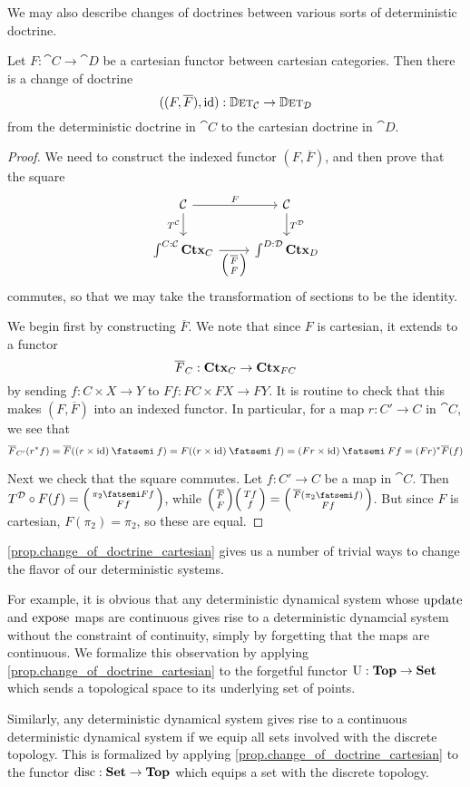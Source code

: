 \documentclass[DynamicalBook]{subfiles}
\begin{document}
We may also describe changes of doctrines between various sorts of deterministic
doctrine. 
\begin{proposition}\label{prop.change_of_doctrine_cartesian}
Let $F : \cat{C} \to \cat{D}$ be a cartesian functor between cartesian
categories. Then there is a change of doctrine
\[
((F, \overline{F}), \mathrm{id}) : \mathbb{D}\textsc{et}_{\mathcal{C}} \to \mathbb{D}\textsc{et}_{\mathcal{D}} 
\]
from the deterministic doctrine in $\cat{C}$ to the cartesian doctrine in $\cat{D}$.
\end{proposition}
\begin{proof}
We need to construct the indexed functor $(F, \overline{F})$, and then prove
that the square 
\[
  \begin{tikzcd}
\cat{C} \ar[r, "F"]\ar[d,"T^{\cat{C}}"'] & \cat{C}  \ar[d,"T^{\cat{D}}"]\\
  \int^{C : \cat{C}}\smctx{C} \ar[r, "{\littlelens{\overline{F}}{F}}"']  & \int^{D : \cat{D}}
  \smctx{D}  
  \end{tikzcd}
\]
commutes, so that we may take the transformation of sections to be the identity.

We begin first by constructing $\overline{F}$. We note that since $F$ is
cartesian, it extends to a functor
$$\overline{F}_C : \textbf{Ctx}_{C} \to \textbf{Ctx}_{FC}$$
by sending $f : C \times X \to Y$ to $Ff : FC \times FX \to FY$. It is routine
to check that this makes $(F, \overline{F})$ into an indexed functor. In
particular, for a map
$r : C' \to C$ in $\cat{C}$, we see that
\[
\overline{F}_{C'}(r^{\ast}f) = \overline{F}((r \times \id) \then f) = F((r
\times \id) \then f) = (Fr \times \id) \then Ff = (Fr)^{\ast}\overline{F}(f)
\]

Next we check that the square commutes. Let $f : C' \to C$ be a map in
$\cat{C}$. Then $T^{\cat{D}} \circ F (f) = \lens{\pi_2 \then Ff}{Ff}$, while
$\lens{\overline{F}}{F}\lens{Tf}{f} = \lens{\overline{F}(\pi_2 \then f)}{Ff}$.
But since $F$ is cartesian, $F(\pi_2) = \pi_2$, so these are equal.
\end{proof}

\begin{example}
  \cref{prop.change_of_doctrine_cartesian} gives us a number of trivial ways to
  change the flavor of our deterministic systems.

For example, it is obvious that any deterministic dynamical system whose
$\mathrm{update}_{\mathsf{}}$ and $\mathrm{expose}_{\mathsf{}}$ maps are continuous gives rise to a deterministic
dynamcial system without the constraint of continuity, simply by forgetting that
the maps are continuous. We formalize this observation by applying
\cref{prop.change_of_doctrine_cartesian} to the forgetful functor $\mathrm{U} : \textbf{Top}
\to \textbf{Set}$ which sends a topological space to its underlying set of points.

Similarly, any deterministic dynamical system gives rise to a continuous
deterministic dynamical system if we equip all sets involved with the discrete
topology. This is formalized by applying
\cref{prop.change_of_doctrine_cartesian} to the functor $\mathrm{disc} : \textbf{Set} \to
\textbf{Top}$ which equips a set with the discrete topology.
\end{example}
\end{document}
